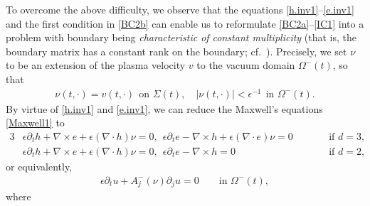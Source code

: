 \documentclass[twoside,11pt]{article}
\numberwithin{equation}{section}
\def\p{\partial}
\begin{document}
	To overcome the above difficulty, we observe that the equations \eqref{h.inv1}--\eqref{e.inv1} and the first condition in \eqref{BC2b} can enable us to reformulate \eqref{BC2a}--\eqref{IC1} into {a problem
	 with boundary being {\it characteristic of constant multiplicity} (that is, the boundary matrix has a constant rank on the boundary; cf.~\cite{R85MR0797053,S95MMASMR1346663,S96aMR1401431,OSY95MR1346224}).}
Precisely,
we set $\nu$ to be an extension of the plasma velocity $v$ to the vacuum domain $\Omega^-(t)$, so that
\begin{align} \label{nu:def0}
	\nu(t,\cdot)=v(t,\cdot)\ \ \textrm{on }\Sigma(t),\quad
	|\nu(t,\cdot)|<\epsilon^{-1}\ \ \textrm{in }\Omega^-(t).
\end{align}
By virtue of \eqref{h.inv1} and \eqref{e.inv1},
we can reduce the Maxwell's equations \eqref{Maxwell1} to
\begin{alignat*}{3}
		&	\epsilon \p_t  h+\nabla \times e+\epsilon (\nabla \cdot h) \nu =0, \ \
		\epsilon \p_t  e-\nabla \times h+\epsilon  (\nabla \cdot e )\nu =0\qquad  &&\textrm{if }d=3,\\[0.5mm]
		&	\epsilon \p_t  h+\nabla \times e+\epsilon (\nabla \cdot h )\nu=0, \ \
		\epsilon \p_t e-\nabla \times h =0 &&\textrm{if }d=2,
\end{alignat*}
or equivalently,
	\begin{align}\label{vacuum2}
		\epsilon \p_t u+%
		A_j^-(\nu)\p_j u=0\qquad\textrm{in }\Omega^-(t),
	\end{align}
	where  %
\end{document}
